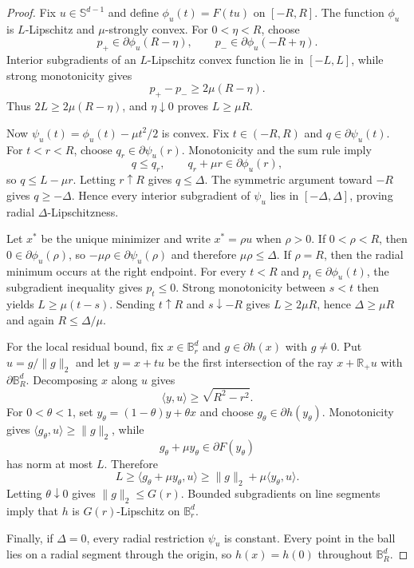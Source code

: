 \documentclass[11pt]{article}
\newcommand{\R}{\mathbb{R}}
\newcommand{\B}{\mathbb{B}}
\newcommand{\Sph}{\mathbb{S}}
\newcommand{\inner}[2]{\langle #1,#2\rangle}
\newcommand{\norm}[1]{\lVert #1\rVert_2}
\theoremstyle{plain}
\theoremstyle{definition}
\begin{document}
\begin{proof}
Fix $u\in\Sph^{d-1}$ and define $\phi_u(t)=F(tu)$ on $[-R,R]$.  The function $\phi_u$ is $L$-Lipschitz and $\mu$-strongly convex.  For $0<\eta<R$, choose
\[
  p_+\in\partial\phi_u(R-\eta),
  \qquad
  p_-\in\partial\phi_u(-R+\eta).
\]
Interior subgradients of an $L$-Lipschitz convex function lie in $[-L,L]$, while strong monotonicity gives
\[
  p_+-p_-\ge 2\mu(R-\eta).
\]
Thus $2L\ge2\mu(R-\eta)$, and $\eta\downarrow0$ proves $L\ge\mu R$.

Now $\psi_u(t)=\phi_u(t)-\mu t^2/2$ is convex.  Fix $t\in(-R,R)$ and $q\in\partial\psi_u(t)$.  For $t<r<R$, choose $q_r\in\partial\psi_u(r)$.  Monotonicity and the sum rule imply
\[
  q\le q_r,
  \qquad
  q_r+\mu r\in\partial\phi_u(r),
\]
so $q\le L-\mu r$.  Letting $r\uparrow R$ gives $q\le\Delta$.  The symmetric argument toward $-R$ gives $q\ge-\Delta$.  Hence every interior subgradient of $\psi_u$ lies in $[-\Delta,\Delta]$, proving radial $\Delta$-Lipschitzness.

Let $x^*$ be the unique minimizer and write $x^*=\rho u$ when $\rho>0$.  If $0<\rho<R$, then $0\in\partial\phi_u(\rho)$, so $-\mu\rho\in\partial\psi_u(\rho)$ and therefore $\mu\rho\le\Delta$.  If $\rho=R$, then the radial minimum occurs at the right endpoint.  For every $t<R$ and $p_t\in\partial\phi_u(t)$, the subgradient inequality gives $p_t\le0$.  Strong monotonicity between $s<t$ then yields $L\ge\mu(t-s)$.  Sending $t\uparrow R$ and $s\downarrow-R$ gives $L\ge2\mu R$, hence $\Delta\ge\mu R$ and again $R\le\Delta/\mu$.

For the local residual bound, fix $x\in\B_r^d$ and $g\in\partial h(x)$ with $g\ne0$.  Put $u=g/\norm{g}$ and let $y=x+tu$ be the first intersection of the ray $x+\R_+u$ with $\partial\B_R^d$.  Decomposing $x$ along $u$ gives
\[
   \inner{y}{u}\ge\sqrt{R^2-r^2}.
\]
For $0<\theta<1$, set $y_\theta=(1-\theta)y+\theta x$ and choose $g_\theta\in\partial h(y_\theta)$.  Monotonicity gives $\inner{g_\theta}{u}\ge\norm{g}$, while
\[
   g_\theta+\mu y_\theta\in\partial F(y_\theta)
\]
has norm at most $L$.  Therefore
\[
  L\ge \inner{g_\theta+\mu y_\theta}{u}
    \ge \norm{g}+\mu\inner{y_\theta}{u}.
\]
Letting $\theta\downarrow0$ gives $\norm{g}\le G(r)$.  Bounded subgradients on line segments imply that $h$ is $G(r)$-Lipschitz on $\B_r^d$.

Finally, if $\Delta=0$, every radial restriction $\psi_u$ is constant.  Every point in the ball lies on a radial segment through the origin, so $h(x)=h(0)$ throughout $\B_R^d$.
\end{proof}
\end{document}
